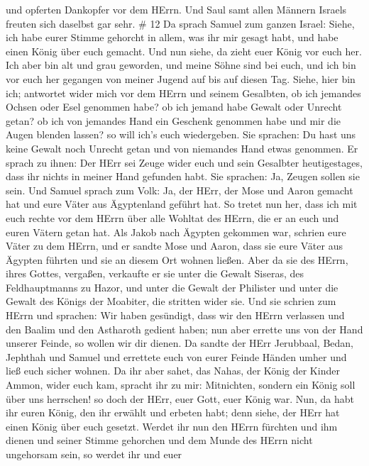 und opferten Dankopfer vor dem HErrn. Und Saul samt allen Männern
Israels freuten sich daselbst gar sehr. \# 12  Da sprach
Samuel zum ganzen Israel: Siehe, ich habe eurer Stimme gehorcht in
allem, was ihr mir gesagt habt, und habe einen König über euch gemacht.
 Und nun siehe, da zieht euer König vor euch her. Ich aber
bin alt und grau geworden, und meine Söhne sind bei euch, und ich bin
vor euch her gegangen von meiner Jugend auf bis auf diesen Tag.
 Siehe, hier bin ich; antwortet wider mich vor dem HErrn und
seinem Gesalbten, ob ich jemandes Ochsen oder Esel genommen habe? ob ich
jemand habe Gewalt oder Unrecht getan? ob ich von jemandes Hand ein
Geschenk genommen habe und mir die Augen blenden lassen? so will ich's
euch wiedergeben.  Sie sprachen: Du hast uns keine Gewalt
noch Unrecht getan und von niemandes Hand etwas genommen. 
Er sprach zu ihnen: Der HErr sei Zeuge wider euch und sein Gesalbter
heutigestages, dass ihr nichts in meiner Hand gefunden habt. Sie
sprachen: Ja, Zeugen sollen sie sein.  Und Samuel sprach zum
Volk: Ja, der HErr, der Mose und Aaron gemacht hat und eure Väter aus
Ägyptenland geführt hat.  So tretet nun her, dass ich mit
euch rechte vor dem HErrn über alle Wohltat des HErrn, die er an euch
und euren Vätern getan hat.  Als Jakob nach Ägypten gekommen
war, schrien eure Väter zu dem HErrn, und er sandte Mose und Aaron, dass
sie eure Väter aus Ägypten führten und sie an diesem Ort wohnen ließen.
 Aber da sie des HErrn, ihres Gottes, vergaßen, verkaufte er
sie unter die Gewalt Siseras, des Feldhauptmanns zu Hazor, und unter die
Gewalt der Philister und unter die Gewalt des Königs der Moabiter, die
stritten wider sie.  Und sie schrien zum HErrn und
sprachen: Wir haben gesündigt, dass wir den HErrn verlassen und den
Baalim und den Astharoth gedient haben; nun aber errette uns von der
Hand unserer Feinde, so wollen wir dir dienen.  Da sandte
der HErr Jerubbaal, Bedan, Jephthah und Samuel und errettete euch von
eurer Feinde Händen umher und ließ euch sicher wohnen.  Da
ihr aber sahet, das Nahas, der König der Kinder Ammon, wider euch kam,
spracht ihr zu mir: Mitnichten, sondern ein König soll über uns
herrschen! so doch der HErr, euer Gott, euer König war. 
Nun, da habt ihr euren König, den ihr erwählt und erbeten habt; denn
siehe, der HErr hat einen König über euch gesetzt.  Werdet
ihr nun den HErrn fürchten und ihm dienen und seiner Stimme gehorchen
und dem Munde des HErrn nicht ungehorsam sein, so werdet ihr und euer
